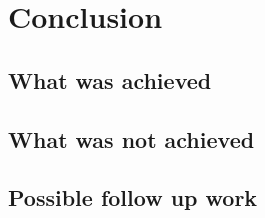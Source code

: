 \chapter{Conclusion}

\section{What was achieved}

\section{What was not achieved}

\section{Possible follow up work}
